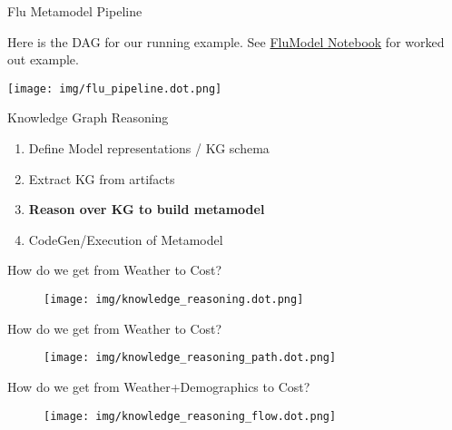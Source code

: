 \documentclass[ignorenonframetext,]{beamer}
\providecommand{\tightlist}{%
  \setlength{\itemsep}{0pt}\setlength{\parskip}{0pt}}
\begin{document}
\begin{frame}{Flu Metamodel Pipeline}
\protect\hypertarget{flu-metamodel-pipeline}{}

Here is the DAG for our running example.
See \href{}{FluModel Notebook} for worked out example.
\begin{center}
\texttt{[image: img/flu\_pipeline.dot.png]}
\end{center}


\end{frame}

\begin{frame}{Knowledge Graph Reasoning}
\protect\hypertarget{knowledge-graph-reasoning}{}

\begin{enumerate}
\tightlist
\item
  Define Model representations / KG schema
\item
  Extract KG from artifacts
\item
  \textbf{Reason over KG to build metamodel}
\item
  CodeGen/Execution of Metamodel
\end{enumerate}

\end{frame}

\begin{frame}{How do we get from Weather to Cost?}
\protect\hypertarget{how-do-we-get-from-weather-to-cost}{}

\begin{figure}
\centering
\texttt{[image: img/knowledge\_reasoning.dot.png]}
\end{figure}

\end{frame}

\begin{frame}{How do we get from Weather to Cost?}
\protect\hypertarget{how-do-we-get-from-weather-to-cost}{}

\begin{figure}
\centering
\texttt{[image: img/knowledge\_reasoning\_path.dot.png]}
\end{figure}

\end{frame}

\begin{frame}{How do we get from Weather+Demographics to Cost?}
\protect\hypertarget{how-do-we-get-from-weatherdemographics-to-cost}{}

\begin{figure}
\centering
\texttt{[image: img/knowledge\_reasoning\_flow.dot.png]}
\end{figure}

\end{frame}
\end{document}
